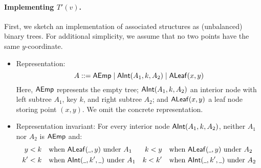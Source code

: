 \documentclass[a4paper]{article}
\newcommand{\any}{{\rule[-.2ex]{1ex}{.4pt}}}	%
\begin{document}
\paragraph{Implementing $T'(v)$.}
First, we sketch an implementation of associated structures as (unbalanced) binary trees.
For additional simplicity, we assume that no two points have the same $y$-coordinate.
\begin{itemize}

\item
Representation:
\[
	A ::= \mathsf{AEmp} \mid \mathsf{AInt}(A_1, k, A_2) \mid \mathsf{ALeaf}(x,y)
\]
Here, $\mathsf{AEmp}$ represents the empty tree; $\mathsf{AInt}(A_1, k, A_2)$ an interior node with left subtree $A_1$, key $k$, and right subtree $A_2$; and $\mathsf{ALeaf}(x,y)$ a leaf node storing point $(x,y)$.
We omit the concrete representation.

\item
Representation invariant:
For every interior node $\mathsf{AInt}(A_1,k,A_2)$, neither $A_1$ nor $A_2$ is $\mathsf{AEmp}$ and:
\begin{align*}
	y < k \quad &\text{when $\ALEAF(\any,y)$ under $A_1$} &	k < y \quad &\text{when $\ALEAF(\any,y)$ under $A_2$} \\
	k' < k \quad &\text{when $\AINT(\any,k',\any)$ under $A_1$} & k < k' \quad &\text{when $\AINT(\any,k',\any)$ under $A_2$}
\end{align*}


\end{itemize}
\end{document}
